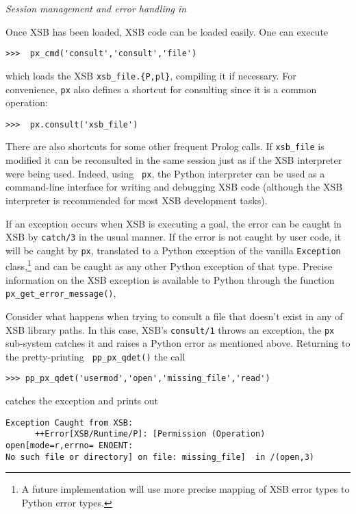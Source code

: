 \begin{example} \rm {\it Session management and error handling in \px}

  Once XSB has been loaded, XSB code can be loaded easily.  One can
  execute
  
\begin{verbatim}
>>>  px_cmd('consult','consult','file')
\end{verbatim}

\noindent
which loads the XSB {\tt xsb\_file.\{P,pl\}}, compiling it if
necessary.  For convenience, {\tt px} also defines a shortcut for
consulting since it is a common operation:

\begin{verbatim}
>>>  px.consult('xsb_file')
\end{verbatim}

\noindent
There are also shortcuts for some other frequent Prolog calls.  If
{\tt xsb\_file} is modified it can be reconsulted in the same session
just as if the XSB interpreter were being used.  Indeed, using {\tt
  px}, the Python interpreter can be used as a command-line interface
for writing and debugging XSB code (although the XSB interpreter is
recommended for most XSB development tasks).

If an exception occurs when XSB is executing a goal, the error can be
caught in XSB by {\tt catch/3} in the usual manner.  If the error is
not caught by user code, it will be caught by {\tt px}, translated to
a Python exception of the vanilla {\tt Exception} class,\footnote{A
  future implementation will use more precise mapping of XSB error
  types to Python error types.}  and can be caught as any other Python
exception of that type.  Precise information on the XSB exception is
available to Python through the \px{} function {\tt
  px\_get\_error\_message()},

Consider what happens when trying to consult a file that doesn't exist
in any of XSB library paths.  In this case, XSB's {\tt consult/1}
throws an exception, the {\tt px} sub-system catches it and raises a
Python error as mentioned above.  Returning to the pretty-printing {\tt
  pp\_px\_qdet()} the call

\begin{verbatim}
>>> pp_px_qdet('usermod','open','missing_file','read')
\end{verbatim}

\noindent
catches the exception and prints out

\begin{verbatim} 
Exception Caught from XSB: 
      ++Error[XSB/Runtime/P]: [Permission (Operation) open[mode=r,errno= ENOENT: 
No such file or directory] on file: missing_file]  in /(open,3)
\end{verbatim}


\end{example}
